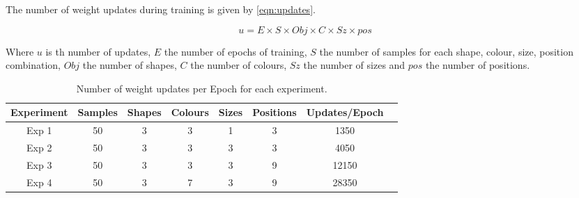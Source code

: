 


The number of weight updates during training is given by \autoref{eqn:updates}.

\begin{equation}\label{eqn:updates}
u = E \times S \times Obj \times C \times Sz \times pos
\end{equation}

Where $u$ is th number of updates, $E$ the number of epochs of training, $S$ the number of samples for each shape, colour, size, position combination, $Obj$ the number of shapes, $C$ the number of colours, $Sz$ the number of sizes and $pos$ the number of positions.


\begin{table}
\centering
\begin{tabular}{|c|c|c|c|c|c|c|c|}
\hline
\textbf{Experiment} & \textbf{Samples} & \textbf{Shapes} & \textbf{Colours} & \textbf{Sizes} & \textbf{Positions} & \textbf{Updates/Epoch} \\ \hline
Exp 1 & 50 & 3 & 3 & 1 & 3 & 1350 \\ \hline
Exp 2 & 50 & 3 & 3 & 3 & 3 & 4050 \\ \hline
Exp 3 & 50 & 3 & 3 & 3 & 9 & 12150 \\ \hline
Exp 4 & 50 & 3 & 7 & 3 & 9 & 28350 \\ \hline

\end{tabular}
\caption{Number of weight updates per Epoch for each experiment.}
\label{tab:updatesperEpoch}
\end{table}

